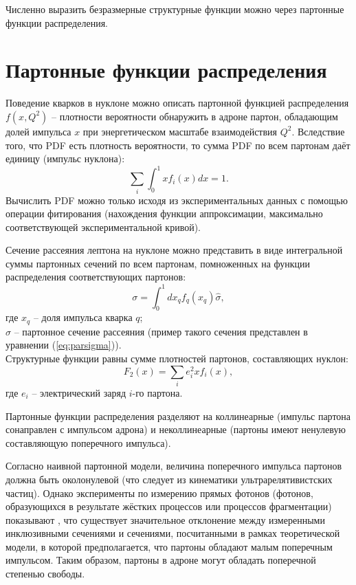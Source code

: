 \documentclass{extreport}
\begin{document}
Численно выразить безразмерные структурные функции можно через партонные функции распределения.

\section{Партонные функции распределения}
Поведение кварков в нуклоне можно описать партонной функцией распределения $f(x,Q^2)$ – плотности вероятности обнаружить в адроне партон, обладающим долей импульса $x$ при энергетическом масштабе взаимодействия $Q^2$. Вследствие того, что PDF есть плотность вероятности, то сумма PDF по всем партонам даёт единицу (импульс нуклона):
\begin{equation}
	\sum_i \int_0^1 x f_i(x)dx = 1.
\end{equation}
Вычислить PDF можно только исходя из экспериментальных данных с помощью операции фитирования (нахождения функции аппроксимации, максимально соответствующей экспериментальной кривой). 

Сечение рассеяния лептона на нуклоне можно представить в виде интегральной суммы партонных сечений по всем партонам, помноженных на функции распределения соответствующих партонов:
\begin{equation}
	\sigma = \int_0^1 dx_q f_q(x_q) \hat{\sigma},
\end{equation}
где $x_q$ -- доля импульса кварка $q$; \\ $\hat{\sigma}$ -- партонное сечение рассеяния (пример такого сечения представлен в уравнении (\ref{eq:parsigma})).\\
Структурные функции равны сумме плотностей партонов, составляющих нуклон:
\begin{equation}
	F_2(x) = \sum_i e^2_i x f_i(x),
\end{equation}
где $e_i$ -- электрический заряд $i$-го партона.


Партонные функции распределения разделяют на коллинеарные (импульс партона сонаправлен с импульсом адрона) и неколлинеарные (партоны имеют ненулевую составляющую поперечного импульса).


Согласно наивной партонной модели, величина поперечного импульса партонов должна быть околонулевой (что следует из кинематики ультрарелятивистских частиц). Однако эксперименты по измерению прямых фотонов (фотонов, образующихся в результате жёстких процессов или процессов фрагментации) показывают \cite{Adams_1995}, что существует значительное отклонение между измеренными инклюзивными сечениями и сечениями, посчитанными в рамках теоретической модели, в которой предполагается, что партоны обладают малым поперечным импульсом. Таким образом, партоны в адроне могут обладать поперечной степенью свободы. 
\end{document}
